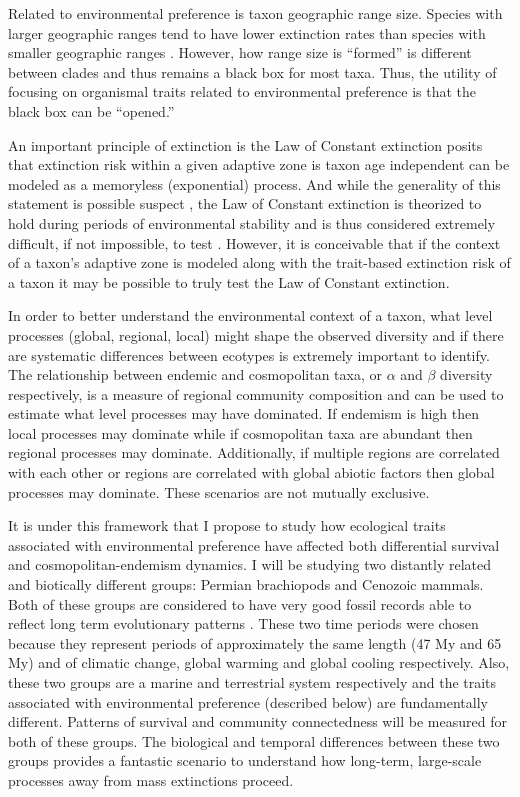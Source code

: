 \documentclass[12pt,letterpaper]{article}
\begin{document}
Related to environmental preference is taxon geographic range size. Species with larger geographic ranges tend to have lower extinction rates than species with smaller geographic ranges \citep{Jablonski1986,Harnik2013,Nurnberg2013a,Jablonski2003,Roy2009c}. However, how range size is ``formed'' is different between clades \citep{Jablonski1987} and thus remains a black box for most taxa. Thus, the utility of focusing on organismal traits related to environmental preference is that the black box can be ``opened.''

An important principle of extinction is the Law of Constant extinction \citep{VanValen1973} posits that extinction risk within a given adaptive zone is taxon age independent can be modeled as a memoryless (exponential) process. And while the generality of this statement is possible suspect \citep{Drake2014,Raup1975,Sepkoski1975,Finnegan2008,Raup1991a}, the Law of Constant extinction is theorized to hold during periods of environmental stability and is thus considered extremely difficult, if not impossible, to test \citep{Liow2011a}. However, it is conceivable that if the context of a taxon's adaptive zone is modeled along with the trait-based extinction risk of a taxon it may be possible to truly test the Law of Constant extinction.

In order to better understand the environmental context of a taxon, what level processes (global, regional, local) might shape the observed diversity and if there are systematic differences between ecotypes is extremely important to identify. The relationship between endemic and cosmopolitan taxa, or \(\alpha\) and \(\beta\) diversity respectively, is a measure of regional community composition and can be used to estimate what level processes may have dominated. If endemism is high then local processes may dominate while if cosmopolitan taxa are abundant then regional processes may dominate. Additionally, if multiple regions are correlated with each other or regions are correlated with global abiotic factors then global processes may dominate. These scenarios are not mutually exclusive. 

It is under this framework that I propose to study how ecological traits associated with environmental preference have affected both differential survival and cosmopolitan-endemism dynamics. I will be studying two distantly related and biotically different groups: Permian brachiopods and Cenozoic mammals. Both of these groups are considered to have very good fossil records able to reflect long term evolutionary patterns \citep{Mark1977}. These two time periods were chosen because they represent periods of approximately the same length (47 My and 65 My) and of climatic change, global warming and global cooling respectively. Also, these two groups are a marine and terrestrial system respectively and the traits associated with environmental preference (described below) are fundamentally different. Patterns of survival and community connectedness will be measured for both of these groups. The biological and temporal differences between these two groups provides a fantastic scenario to understand how long-term, large-scale processes away from mass extinctions proceed.
\end{document}

